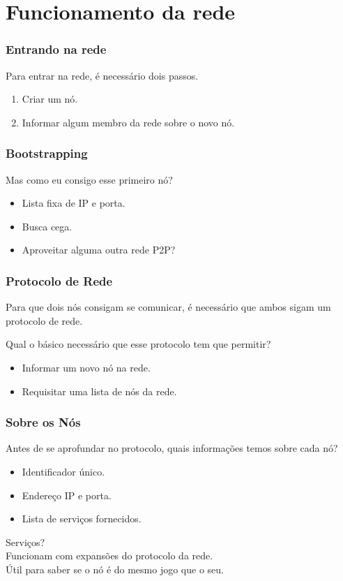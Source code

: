 \documentclass[brazil]{beamer}
\begin{document}
\section{Funcionamento da rede}
\begin{frame}
  \frametitle{Entrando na rede}
  Para entrar na rede, é necessário dois passos.
  \pause
  \begin{enumerate}
    \item Criar um nó.
    \pause
    \item Informar algum membro da rede sobre o novo nó.
  \end{enumerate}
\end{frame}
\begin{frame}
  \frametitle{Bootstrapping}
  
  Mas como eu consigo esse primeiro nó?
  \vspace{20pt}
  \pause
  \begin{itemize}
    \item Lista fixa de IP e porta.
    \pause
    \item Busca cega.
    \pause
    \item Aproveitar alguma outra rede P2P?
  \end{itemize}
\end{frame}
\begin{frame}
  \frametitle{Protocolo de Rede}
  
  Para que dois nós consigam se comunicar, é necessário que ambos sigam um protocolo de rede.
  
  \vspace{20pt}
  \pause
  
  Qual o básico necessário que esse protocolo tem que permitir?
  \begin{itemize}
    \pause
    \item Informar um novo nó na rede.
    \pause
    \item Requisitar uma lista de nós da rede.
  \end{itemize}
\end{frame}
\begin{frame}
  \frametitle{Sobre os Nós}
  
  Antes de se aprofundar no protocolo, quais informações temos sobre cada nó?
  \pause
  \begin{itemize}
    \item Identificador único.
    \pause
    \item Endereço IP e porta.
    \pause
    \item Lista de serviços fornecidos.
  \end{itemize}
  \vspace{15pt}
  \pause
  Serviços? \\
  \pause
  Funcionam com expansões do protocolo da rede. \\
  Útil para saber se o nó é do mesmo jogo que o seu.
  
\end{frame}
\end{document}
